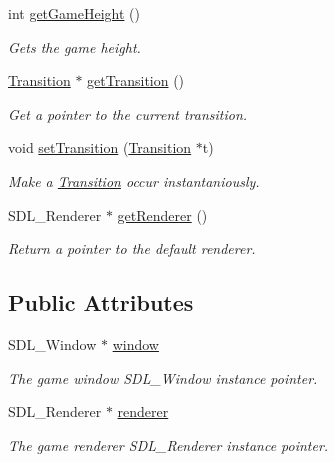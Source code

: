 \begin{DoxyCompactItemize}
int \hyperlink{class_graphics_a714496ad1b9244d6f9dafe665b35860d}{get\-Game\-Height} ()
\begin{DoxyCompactList}\small\item\em Gets the game height. \end{DoxyCompactList}\item 
\hyperlink{class_transition}{Transition} $\ast$ \hyperlink{class_graphics_ab70377438ad3cd1a77fa5d802c7eb324}{get\-Transition} ()
\begin{DoxyCompactList}\small\item\em Get a pointer to the current transition. \end{DoxyCompactList}\item 
void \hyperlink{class_graphics_a3eb162b89e24962a946bc40e708dd0a0}{set\-Transition} (\hyperlink{class_transition}{Transition} $\ast$t)
\begin{DoxyCompactList}\small\item\em Make a \hyperlink{class_transition}{Transition} occur instantaniously. \end{DoxyCompactList}\item 
S\-D\-L\-\_\-\-Renderer $\ast$ \hyperlink{class_graphics_afacc722603c661f667d0fcfd43f7ab5c}{get\-Renderer} ()
\begin{DoxyCompactList}\small\item\em Return a pointer to the default renderer. \end{DoxyCompactList}\end{DoxyCompactItemize}
\subsection*{Public Attributes}
\begin{DoxyCompactItemize}
\item 
S\-D\-L\-\_\-\-Window $\ast$ \hyperlink{class_graphics_af397f61e26b41302b0b66ee4ab408952}{window}
\begin{DoxyCompactList}\small\item\em The game window S\-D\-L\-\_\-\-Window instance pointer. \end{DoxyCompactList}\item 
S\-D\-L\-\_\-\-Renderer $\ast$ \hyperlink{class_graphics_afee9119ae93eafc5707a9e868b539a2e}{renderer}
\begin{DoxyCompactList}\small\item\em The game renderer S\-D\-L\-\_\-\-Renderer instance pointer. \end{DoxyCompactList}\end{DoxyCompactItemize}
